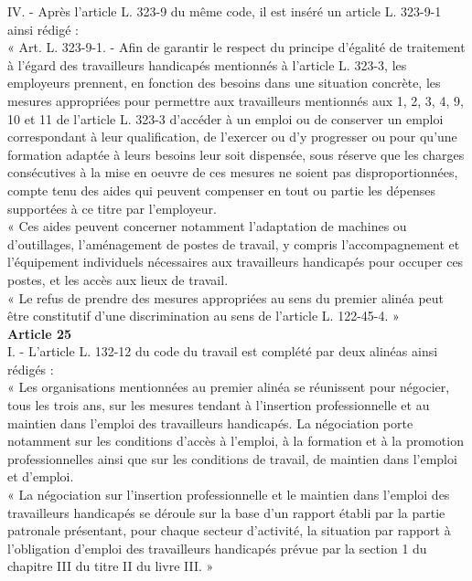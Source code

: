 IV. - Après l'article L. 323-9 du même code, il est inséré un article L. 323-9-1 ainsi rédigé :\\
« Art. L. 323-9-1. - Afin de garantir le respect du principe d'égalité de traitement à l'égard des travailleurs handicapés mentionnés à l'article L. 323-3, les employeurs prennent, en fonction des besoins dans une situation concrète, les mesures appropriées pour permettre aux travailleurs mentionnés aux 1, 2, 3, 4, 9, 10 et 11 de l'article L. 323-3 d'accéder à un emploi ou de conserver un emploi correspondant à leur qualification, de l'exercer ou d'y progresser ou pour qu'une formation adaptée à leurs besoins leur soit dispensée, sous réserve que les charges consécutives à la mise en oeuvre de ces mesures ne soient pas disproportionnées, compte tenu des aides qui peuvent compenser en tout ou partie les dépenses supportées à ce titre par l'employeur.\\
« Ces aides peuvent concerner notamment l'adaptation de machines ou d'outillages, l'aménagement de postes de travail, y compris l'accompagnement et l'équipement individuels nécessaires aux travailleurs handicapés pour occuper ces postes, et les accès aux lieux de travail.\\
« Le refus de prendre des mesures appropriées au sens du premier alinéa peut être constitutif d'une discrimination au sens de l'article L. 122-45-4. »\\



\textbf{Article 25}\\

I. - L'article L. 132-12 du code du travail est complété par deux alinéas ainsi rédigés :\\
« Les organisations mentionnées au premier alinéa se réunissent pour négocier, tous les trois ans, sur les mesures tendant à l'insertion professionnelle et au maintien dans l'emploi des travailleurs handicapés. La négociation porte notamment sur les conditions d'accès à l'emploi, à la formation et à la promotion professionnelles ainsi que sur les conditions de travail, de maintien dans l'emploi et d'emploi.\\
« La négociation sur l'insertion professionnelle et le maintien dans l'emploi des travailleurs handicapés se déroule sur la base d'un rapport établi par la partie patronale présentant, pour chaque secteur d'activité, la situation par rapport à l'obligation d'emploi des travailleurs handicapés prévue par la section 1 du chapitre III du titre II du livre III. »\\

